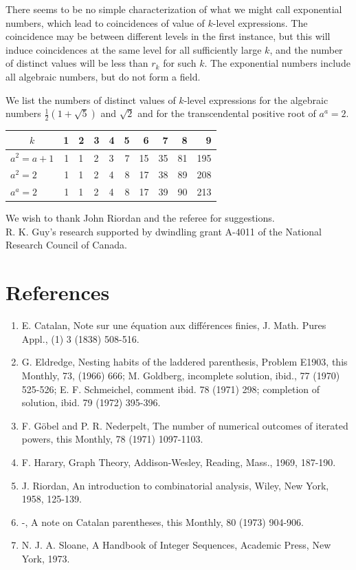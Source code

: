 \documentclass[10pt]{article}
\begin{document}
There seems to be no simple characterization of what we might call exponential numbers, which lead to coincidences of value of $k$-level expressions. The coincidence may be between different levels in the first instance, but this will induce coincidences at the same level for all sufficiently large $k$, and the number of distinct values will be less than $r_{k}$ for such $k$. The exponential numbers include all algebraic numbers, but do not form a field.

We list the numbers of distinct values of $k$-level expressions for the algebraic numbers $\frac{1}{2}(1+\sqrt{5})$ and $\sqrt{2}$ and for the transcendental positive root of $a^{a}=2$.

\begin{center}
\begin{tabular}{l|rlllrrrrr}
\multicolumn{1}{c}{$k$} & 1 & 2 & 3 & 4 & 5 & 6 & 7 & 8 & 9 \\
\hline
$a^{2}=a+1$ & 1 & 1 & 2 & 3 & 7 & 15 & 35 & 81 & 195 \\
$a^{2}=2$ & 1 & 1 & 2 & 4 & 8 & 17 & 38 & 89 & 208 \\
$a^{a}=2$ & 1 & 1 & 2 & 4 & 8 & 17 & 39 & 90 & 213 \\
\end{tabular}
\end{center}

We wish to thank John Riordan and the referee for suggestions.\\
R. K. Guy's research supported by dwindling grant A-4011 of the National Research Council of Canada.

\section*{References}
\begin{enumerate}
  \item E. Catalan, Note sur une équation aux différences finies, J. Math. Pures Appl., (1) 3 (1838) 508-516.
  \item G. Eldredge, Nesting habits of the laddered parenthesis, Problem E1903, this Monthly, 73, (1966) 666; M. Goldberg, incomplete solution, ibid., 77 (1970) 525-526; E. F. Schmeichel, comment ibid. 78 (1971) 298; completion of solution, ibid. 79 (1972) 395-396.
  \item F. Göbel and P. R. Nederpelt, The number of numerical outcomes of iterated powers, this Monthly, 78 (1971) 1097-1103.
  \item F. Harary, Graph Theory, Addison-Wesley, Reading, Mass., 1969, 187-190.
  \item J. Riordan, An introduction to combinatorial analysis, Wiley, New York, 1958, 125-139.
  \item -, A note on Catalan parentheses, this Monthly, 80 (1973) 904-906.
  \item N. J. A. Sloane, A Handbook of Integer Sequences, Academic Press, New York, 1973.
\end{enumerate}
\end{document}
